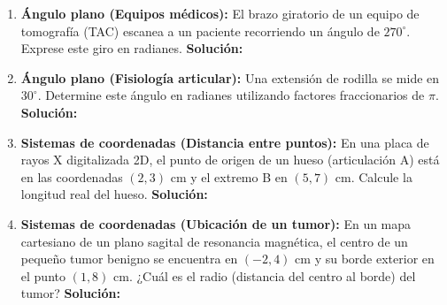 \documentclass[12pt,letterpaper]{article}
\begin{document}
\begin{enumerate}
    \item \textbf{Ángulo plano (Equipos médicos):} El brazo giratorio de un equipo de tomografía (TAC) escanea a un paciente recorriendo un ángulo de $270^\circ$. Exprese este giro en radianes.
    \textbf{Solución:} \\

    
    \item \textbf{Ángulo plano (Fisiología articular):} Una extensión de rodilla se mide en $30^\circ$. Determine este ángulo en radianes utilizando factores fraccionarios de $\pi$.
    \textbf{Solución:} \\

    \item \textbf{Sistemas de coordenadas (Distancia entre puntos):} En una placa de rayos X digitalizada 2D, el punto de origen de un hueso (articulación A) está en las coordenadas $(2, 3)$ cm y el extremo B en $(5, 7)$ cm. Calcule la longitud real del hueso.
    \textbf{Solución:} \\

    
    \item \textbf{Sistemas de coordenadas (Ubicación de un tumor):} En un mapa cartesiano de un plano sagital de resonancia magnética, el centro de un pequeño tumor benigno se encuentra en $(-2, 4)$ cm y su borde exterior en el punto $(1, 8)$ cm. ¿Cuál es el radio (distancia del centro al borde) del tumor?
    \textbf{Solución:} \\

    

\end{enumerate}
\end{document}
